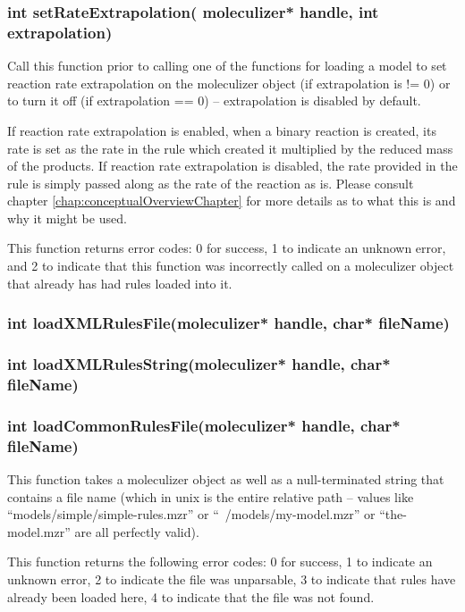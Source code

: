 \subsubsection{int setRateExtrapolation( moleculizer* handle, int
  extrapolation)}
Call this function prior to calling one of the functions for loading a
model to set reaction rate extrapolation on the moleculizer object (if
extrapolation is != 0) or to turn it off (if extrapolation == 0) --
extrapolation is disabled by default.

If reaction rate extrapolation is enabled, when a binary reaction is
created, its rate is set as the rate in the rule which created it multiplied
by the reduced mass of the products.  If reaction rate extrapolation
is disabled, the rate provided in the rule is simply passed along as
the rate of the reaction as is.  Please consult chapter
\ref{chap:conceptualOverviewChapter} for more details as to what this
is and why it might be used.

This function returns error codes: 0 for success, 1 to indicate an
unknown error, and 2 to indicate that this function was incorrectly
called on a moleculizer object that already has had rules loaded into
it.  

\subsubsection{int loadXMLRulesFile(moleculizer* handle, char* fileName)}

\subsubsection{int loadXMLRulesString(moleculizer* handle, char* fileName)}

\subsubsection{int loadCommonRulesFile(moleculizer* handle, char* fileName)}
This function takes a moleculizer object as well as a null-terminated
string that contains a file name (which in unix is the entire relative
path -- values like ``models/simple/simple-rules.mzr'' or
``~/models/my-model.mzr'' or ``the-model.mzr'' are all perfectly
valid).

This function returns the following error codes: 0 for success, 1 to
indicate an unknown error, 2 to indicate the file was unparsable, 3 to
indicate that rules have already been loaded here, 4 to indicate that
the file was not found.

